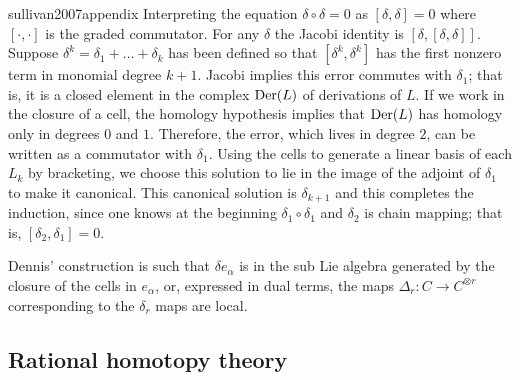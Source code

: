 \begin{displaycquote}[p.251]{sullivan2007appendix}
	Interpreting the equation $\delta \circ \delta = 0$ as $[\delta, \delta] = 0$ where $[\cdot, \cdot]$ is the graded commutator.
	For any $\delta$ the Jacobi identity is $[\delta, [\delta, \delta]]$.
	Suppose $\delta^k = \delta_1 + \dots + \delta_k$ has been defined so that $[\delta^k, \delta^k]$ has the first nonzero term in monomial degree $k + 1$.
	Jacobi implies this error commutes with $\delta_1$; that is, it is a closed element in the complex $\mathrm{Der}(L)$ of derivations of $L$.
	If we work in the closure of a cell, the homology hypothesis implies that $\mathrm{Der}(L)$ has homology only in degrees $0$ and $1$.
	Therefore, the error, which lives in degree $2$, can be written as a commutator with $\delta_1$.
	Using the cells to generate a linear basis of each $L_k$ by bracketing, we choose this solution to lie in the image of the adjoint of $\delta_1$ to make it canonical.
	This canonical solution is $\delta_{k+1}$ and this completes the induction, since one knows at the beginning $\delta_1 \circ \delta_1$
	and $\delta_2$ is chain mapping; that is, $[\delta_2, \delta_1] = 0$.
\end{displaycquote}

Dennis' construction is such that $\delta e_\alpha$ is in the sub Lie algebra generated by the closure of the cells in $e_\alpha$, or, expressed in dual terms, the maps $\Delta_r \colon C \to C^{\otimes r}$ corresponding to the $\delta_r$ maps are local.

\subsection{Rational homotopy theory}

